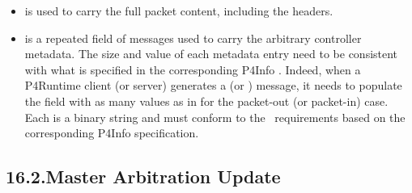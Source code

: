 \documentclass[11pt]{article}
\begin{document}
{%
\begin{itemize}%

\item{}
 is used to carry the full packet content, including the headers.%

\item{}
 is a repeated field of  messages used to carry the
arbitrary controller metadata. The size and value of each metadata entry need
to be consistent with what is specified in the corresponding P4Info
. Indeed, when a P4Runtime client (or server)
generates a  (or ) message, it needs to populate the
 field with as many values as in 
for the packet-out (or packet-in) case. Each  is a
binary string and must conform to the~
requirements based on the corresponding P4Info
 specification.%
\end{itemize}%

\subsection{16.2.\hspace*{0.5em}Master Arbitration Update}\label{sec-master-arbitration-update}%

}
\end{document}
